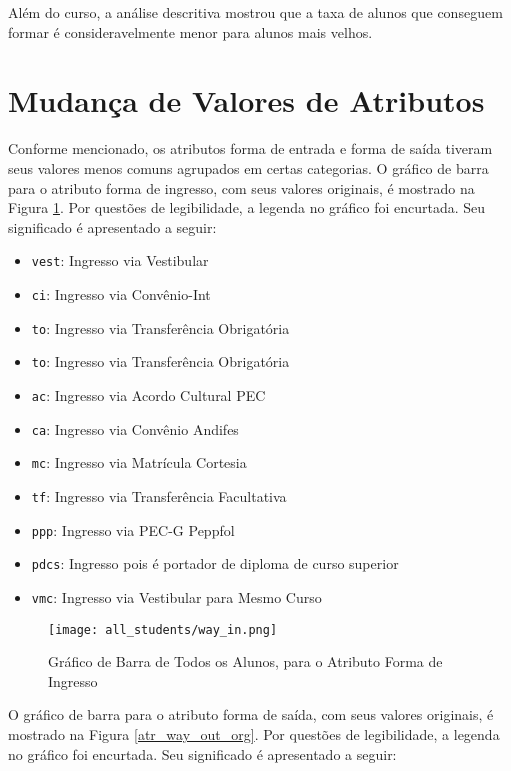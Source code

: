 \par Além do curso, a análise descritiva mostrou que a taxa de alunos que conseguem
formar é consideravelmente menor para alunos mais velhos. 


\section{Mudança de Valores de Atributos}
Conforme mencionado, os atributos forma de entrada e forma de saída tiveram seus
valores menos comuns agrupados em certas categorias. O gráfico de barra para o
atributo forma de ingresso, com seus valores originais, é mostrado na Figura
\ref{atr_way_in_org}. 
Por questões de legibilidade, a legenda no gráfico foi encurtada. Seu significado é
apresentado a seguir: 

    \begin{itemize}
    \item \texttt{vest}: Ingresso via Vestibular
    \item \texttt{ci}: Ingresso via Convênio-Int
    \item \texttt{to}: Ingresso via Transferência Obrigatória
    \item \texttt{to}: Ingresso via Transferência Obrigatória
    \item \texttt{ac}: Ingresso via Acordo Cultural PEC
    \item \texttt{ca}: Ingresso via Convênio Andifes
    \item \texttt{mc}: Ingresso via Matrícula Cortesia
    \item \texttt{tf}: Ingresso via Transferência Facultativa
    \item \texttt{ppp}: Ingresso via PEC-G Peppfol
    \item \texttt{pdcs}: Ingresso pois é portador de diploma de curso superior
    \item \texttt{vmc}: Ingresso via Vestibular para Mesmo Curso
    \end{itemize}

    \begin{figure}[!ht]
    \caption{Gráfico de Barra de Todos os Alunos, para o Atributo Forma de Ingresso}
    \centering
    \texttt{[image: all\_students/way\_in.png]}
    \label{atr_way_in_org}
    \end{figure}

O gráfico de barra para o atributo forma de saída, com seus valores originais, é
mostrado na Figura \ref{atr_way_out_org}. 
Por questões de legibilidade, a legenda no gráfico foi encurtada. Seu significado é
apresentado a seguir: 

